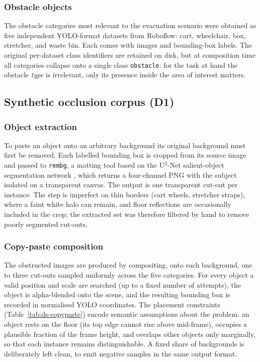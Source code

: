 \subsubsection{Obstacle objects}

The obstacle categories most relevant to the evacuation scenario were obtained as
five independent YOLO-format datasets from Roboflow: cart, wheelchair, box,
stretcher, and waste bin. Each comes with images and bounding-box labels. The
original per-dataset class identifiers are retained on disk, but at composition
time all categories collapse onto a single class \texttt{obstacle}: for the task
at hand the obstacle \emph{type} is irrelevant, only its presence inside the area
of interest matters.

\subsection{Synthetic occlusion corpus (D1)}

\subsubsection{Object extraction}

To paste an object onto an arbitrary background its original background must first
be removed. Each labelled bounding box is cropped from its source image and passed
to \texttt{rembg}, a matting tool based on the U$^2$-Net salient-object
segmentation network \cite{Qin2020}, which returns a four-channel PNG with the
subject isolated on a transparent canvas. The output is one transparent cut-out
per instance. The step is imperfect on thin borders (cart wheels, stretcher
straps), where a faint white halo can remain, and floor reflections are
occasionally included in the crop; the extracted set was therefore filtered by
hand to remove poorly segmented cut-outs.

\subsubsection{Copy-paste composition}

The obstructed images are produced by compositing, onto each background, one to
three cut-outs sampled uniformly across the five categories. For every object a
valid position and scale are searched (up to a fixed number of attempts), the
object is alpha-blended onto the scene, and the resulting bounding box is recorded
in normalised YOLO coordinates. The placement constraints
(Table~\ref{tab:ds-copypaste}) encode semantic assumptions about the problem: an
object rests on the floor (its top edge cannot rise above mid-frame), occupies a
plausible fraction of the frame height, and overlaps other objects only
marginally, so that each instance remains distinguishable. A fixed share of
backgrounds is deliberately left clean, to emit negative samples in the same
output format.

